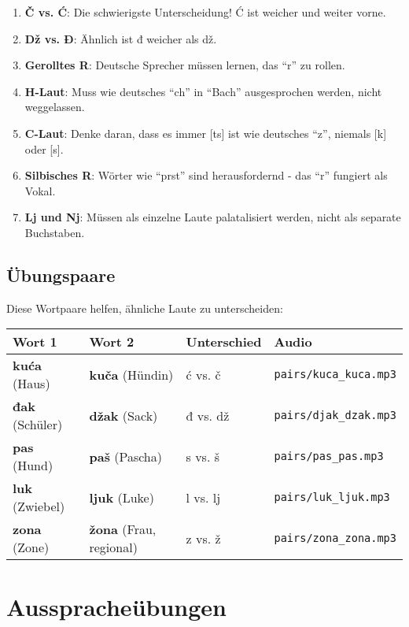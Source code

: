 \begin{enumerate}
    \item \textbf{Č vs. Ć}: Die schwierigste Unterscheidung! Ć ist weicher und weiter vorne.
    \item \textbf{Dž vs. Đ}: Ähnlich ist đ weicher als dž.
    \item \textbf{Gerolltes R}: Deutsche Sprecher müssen lernen, das ``r'' zu rollen.
    \item \textbf{H-Laut}: Muss wie deutsches ``ch'' in ``Bach'' ausgesprochen werden, nicht weggelassen.
    \item \textbf{C-Laut}: Denke daran, dass es immer [ts] ist wie deutsches ``z'', niemals [k] oder [s].
    \item \textbf{Silbisches R}: Wörter wie ``prst'' sind herausfordernd - das ``r'' fungiert als Vokal.
    \item \textbf{Lj und Nj}: Müssen als einzelne Laute palatalisiert werden, nicht als separate Buchstaben.
\end{enumerate}

\subsection{Übungspaare}

Diese Wortpaare helfen, ähnliche Laute zu unterscheiden:

\begin{center}
\begin{tabular}{llll}
\toprule
\textbf{Wort 1} & \textbf{Wort 2} & \textbf{Unterschied} & \textbf{Audio} \\
\midrule
\textbf{kuća} (Haus) & \textbf{kuča} (Hündin) & ć vs. č & \texttt{pairs/kuca\_kuca.mp3} \\
\textbf{đak} (Schüler) & \textbf{džak} (Sack) & đ vs. dž & \texttt{pairs/djak\_dzak.mp3} \\
\textbf{pas} (Hund) & \textbf{paš} (Pascha) & s vs. š & \texttt{pairs/pas\_pas.mp3} \\
\textbf{luk} (Zwiebel) & \textbf{ljuk} (Luke) & l vs. lj & \texttt{pairs/luk\_ljuk.mp3} \\
\textbf{zona} (Zone) & \textbf{žona} (Frau, regional) & z vs. ž & \texttt{pairs/zona\_zona.mp3} \\
\bottomrule
\end{tabular}
\end{center}

\section{Ausspracheübungen}

